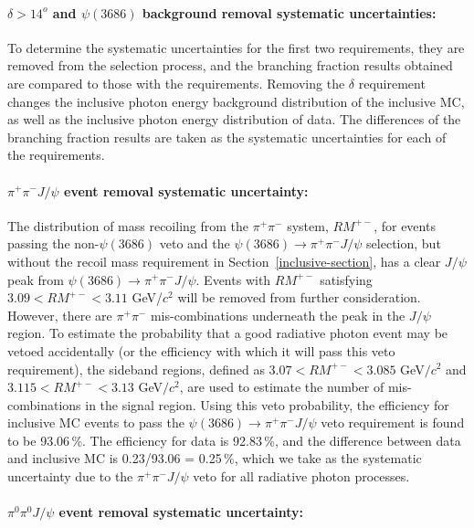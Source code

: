 \documentclass[aps,prd,twocolumn,showpacs,floatfix,byrevtex]{revtex4-1}
\begin{document}
\paragraph*{\bf \boldmath $\delta > 14^o$ and $\psi(3686)$ background removal systematic uncertainties:\\}
To determine the systematic uncertainties for the first two
requirements, they are removed from the selection process,
and the branching fraction results obtained are compared to those with the
requirements. Removing the $\delta$ requirement changes the inclusive
photon energy background distribution of the inclusive MC, as well as the
inclusive photon energy distribution of data.  The differences of the
branching fraction results are taken as the systematic uncertainties
for each of the requirements.

\paragraph*{\bf \boldmath  $\pi^+ \pi^- J/\psi$ event removal
  systematic uncertainty:\\}

The distribution of mass recoiling from the $\pi^+\pi^-$ system,
$RM^{+-}$, for events passing the non-$\psi(3686)$ veto and the
$\psi(3686) \to \pi^+\pi^- J/\psi$ selection, but without the recoil
mass requirement in Section~\ref{inclusive-section}, has a clear
$J/\psi$ peak from $\psi(3686) \to \pi^+\pi^-J/\psi$.  Events with
$RM^{+-}$ satisfying $3.09 < RM^{+-} < 3.11$ GeV/$c^2$ will be removed
from further consideration.  However, there are $\pi^+\pi^-$
mis-combinations underneath the peak in the $J/\psi$ region. To
estimate the probability that a good radiative photon event may be
vetoed accidentally (or the efficiency with which it will pass this
veto requirement), the sideband regions, defined as $ 3.07 < RM^{+-} <
3.085$ GeV$/c^2$ and $ 3.115 < RM^{+-} < 3.13$ GeV$/c^2$, are used to
estimate the number of mis-combinations in the signal region.  Using
this veto probability, the efficiency for inclusive MC events to pass
the $\psi(3686) \to \pi^+\pi^- J/\psi$ veto requirement is found to be
93.06\,\%.  The efficiency for data is 92.83\,\%, and the difference
between data and inclusive MC is 0.23/93.06 = 0.25\,\%, which we take
as the systematic uncertainty due to the $\pi^+ \pi^- J/\psi$ veto for
all radiative photon processes.


\paragraph*{\bf \boldmath  $\pi^0 \pi^0 J/\psi$ event removal
  systematic uncertainty:\\}
\end{document}
